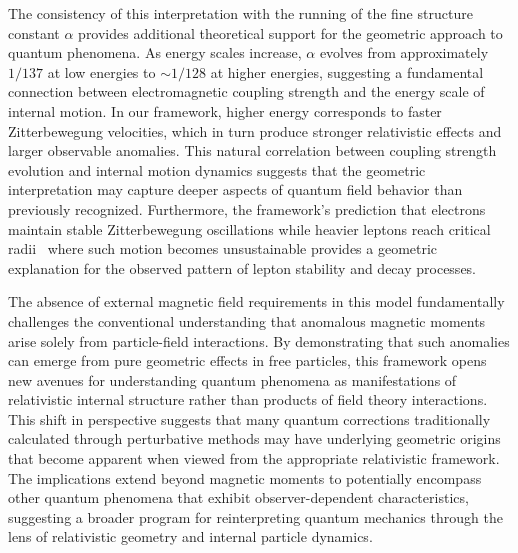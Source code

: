 \documentclass[%
 reprint,
 amsmath,amssymb,
 aps,
]{revtex4-1}
\numberwithin{equation}{section}%
\begin{document}
The consistency of this interpretation with the running of the fine structure constant $\alpha$ provides additional theoretical support for the geometric approach to quantum phenomena. As energy scales increase, $\alpha$ evolves from approximately $1/137$ at low energies to $\sim 1/128$ at higher energies, suggesting a fundamental connection between electromagnetic coupling strength and the energy scale of internal motion. In our framework, higher energy corresponds to faster Zitterbewegung velocities, which in turn produce stronger relativistic effects and larger observable anomalies. This natural correlation between coupling strength evolution and internal motion dynamics suggests that the geometric interpretation may capture deeper aspects of quantum field behavior than previously recognized. Furthermore, the framework's prediction that electrons maintain stable Zitterbewegung oscillations while heavier leptons reach critical radii~\cite{hanamura2501.0130} where such motion becomes unsustainable provides a geometric explanation for the observed pattern of lepton stability and decay processes.

The absence of external magnetic field requirements in this model fundamentally challenges the conventional understanding that anomalous magnetic moments arise solely from particle-field interactions. By demonstrating that such anomalies can emerge from pure geometric effects in free particles, this framework opens new avenues for understanding quantum phenomena as manifestations of relativistic internal structure rather than products of field theory interactions. This shift in perspective suggests that many quantum corrections traditionally calculated through perturbative methods may have underlying geometric origins that become apparent when viewed from the appropriate relativistic framework. The implications extend beyond magnetic moments to potentially encompass other quantum phenomena that exhibit observer-dependent characteristics, suggesting a broader program for reinterpreting quantum mechanics through the lens of relativistic geometry and internal particle dynamics.
\end{document}
